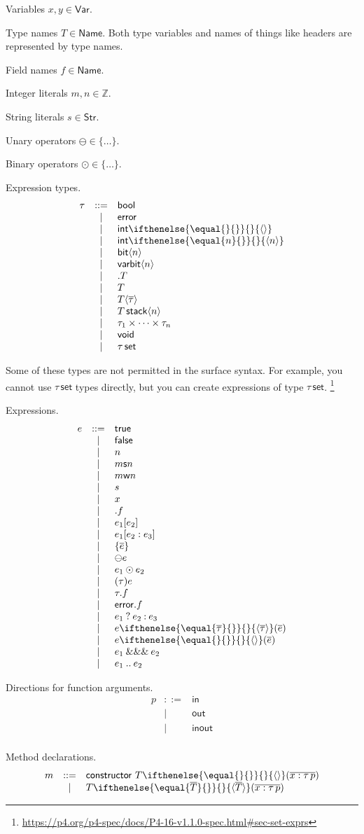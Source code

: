\documentclass[10pt]{article}
\newcommand{\Keyword}[1]{\ensuremath{\mathsf{#1}}}
\newcommand{\SynClassAndCase}[2]{#1 &\mathbin{::=} & #2 \\}
\newcommand{\SynCase}[1]{& \mathbin{|} & #1 \\}
\newenvironment{Syntax}
  {
      $$
      \begin{array}{lcl}
  }
  {
      \end{array}
      $$
  }
\newcommand{\Error}{\Keyword{error}}
\newcommand{\Void}{\Keyword{void}}
\newcommand{\Bool}{\Keyword{bool}}
\newcommand{\True}{\Keyword{true}}
\newcommand{\False}{\Keyword{false}}
\newcommand{\Varbit}[1]{\Keyword{varbit}\langle#1\rangle}
\newcommand{\Int}[1]{
    \Keyword{int}
    \ifthenelse{\equal{#1}{}}
        {}
        {\langle #1 \rangle}
}
\newcommand{\Bit}[1]{\Keyword{bit}\langle#1\rangle}
\newcommand{\Stack}[2]{#1\,\Keyword{stack}\langle#2\rangle}
\newcommand{\Set}[1]{#1\,\Keyword{set}}
\newcommand{\Prod}{\times}
\newcommand{\TApp}[2]{#1 \langle #2 \rangle}
\newcommand{\SignedLit}[2]{#1\Keyword{s}#2}
\newcommand{\UnsignedLit}[2]{#1\Keyword{w}#2}
\newcommand{\Member}{.}
\newcommand{\Index}[2]{#1 [#2]}
\newcommand{\Slice}[3]{#1 [#2 : #3]}
\newcommand{\SetLit}[1]{\{#1\}}
\newcommand{\Many}[1]{\overline{#1}}
\newcommand{\Uop}{\ominus}
\newcommand{\Binop}{\odot}
\newcommand{\Cast}[2]{(#1)#2}
\newcommand{\Ternary}[3]{#1 \mathbin{?} #2 \mathbin{:} #3}
\newcommand{\AppWithTypes}[3]{
    #1
    \ifthenelse{\equal{#2}{}}
        {}
        {\langle #2 \rangle}
    (#3)
}
\newcommand{\FunApp}[3]{\AppWithTypes{#1}{#2}{#3}}
\newcommand{\Mask}{\mathbin{\&\&\&}}
\newcommand{\Range}{\mathbin{..}}
\newcommand{\Var}{\Keyword{Var}}
\newcommand{\Str}{\Keyword{Str}}
\newcommand{\Name}{\Keyword{Name}}
\newcommand{\Z}{\mathbb{Z}}
\newcommand{\Spec}{https://p4.org/p4-spec/docs/P4-16-v1.1.0-spec.html}
\newcommand{\SpecRef}[1]{
    \footnote{\url{\Spec\##1}}
}
\begin{document}
Variables \(x, y \in \Var\).

Type names \(T \in \Name\). Both type variables and names of things like headers
are represented by type names.

Field names \(f \in \Name\).

Integer literals \(m, n \in \Z\).

String literals \(s \in \Str\).

Unary operators \(\ominus \in \{\dots\}\).

Binary operators \(\odot \in \{\dots\}\).

Expression types.
\begin{Syntax}
    \SynClassAndCase{\tau}{\Bool}
    \SynCase{\Error}
    \SynCase{\Int{}}
    \SynCase{\Int{n}}
    \SynCase{\Bit{n}}
    \SynCase{\Varbit{n}}
    \SynCase{.T}
    \SynCase{T}
    \SynCase{\TApp{T}{\Many{\tau}}}
    \SynCase{\Stack{T}{n}}
    \SynCase{\tau_1 \Prod \cdots \Prod \tau_n}
    \SynCase{\Void}
    \SynCase{\Set{\tau}}
\end{Syntax}

Some of these types are not permitted in the surface syntax. For example, you
cannot use \(\Set{\tau}\) types directly, but you can create expressions of type
\(\Set{\tau}\).\SpecRef{sec-set-exprs}

Expressions.
\begin{Syntax}
    \SynClassAndCase{e}{\True}
    \SynCase{\False}
    \SynCase{n}
    \SynCase{\SignedLit{m}{n}}
    \SynCase{\UnsignedLit{m}{n}}
    \SynCase{s}
    \SynCase{x}
    \SynCase{\Member f}
    \SynCase{\Index{e_1}{e_2}}
    \SynCase{\Slice{e_1}{e_2}{e_3}}
    \SynCase{\SetLit{\Many{e}}}
    \SynCase{\Uop e}
    \SynCase{e_1 \Binop e_2}
    \SynCase{\Cast{\tau}{e}}
    \SynCase{\tau \Member f}
    \SynCase{\Error \Member f}
    \SynCase{\Ternary{e_1}{e_2}{e_3}}
    \SynCase{\FunApp{e}{\Many{\tau}}{\Many{e}}}
    \SynCase{\FunApp{e}{}{\Many{e}}}
    \SynCase{e_1 \Mask e_2}
    \SynCase{e_1 \Range e_2}
\end{Syntax}

Directions for function arguments.
\begin{Syntax}
    \SynClassAndCase{p}{\Keyword{in}}
    \SynCase{\Keyword{out}}
    \SynCase{\Keyword{inout}}
\end{Syntax}

Method declarations.
\begin{Syntax}
    \SynClassAndCase{m}{\Keyword{constructor}\ \FunApp{T}{}{\Many{x : \tau\, p}}}
    \SynCase{\FunApp{T}{\Many{T}}{\Many{x : \tau\, p}}}
\end{Syntax}
\end{document}
